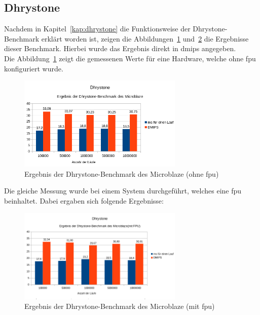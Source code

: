 \subsection{Dhrystone}

Nachdem in Kapitel~\ref{kap:dhrystone} die Funktionsweise der Dhrystone-Benchmark erklärt worden ist, zeigen die Abbildungen~\ref{fig:dhrystonembohnefpu} und~\ref{fig:dhrystonembmitfpu} die Ergebnisse dieser Benchmark.
Hierbei wurde das Ergebnis direkt in \ac{dmips} angegeben.\\
Die Abbildung~\ref{fig:dhrystonembohnefpu} zeigt die gemessenen Werte für eine Hardware, welche ohne \ac{fpu} konfiguriert wurde.

\begin{figure}[H]
\centering
\includegraphics[width=0.7\textwidth]{Hauptteil/dhrystonembohnefpu.png}
\caption{Ergebnis der Dhrystone-Benchmark des Microblaze (ohne \ac{fpu})}
\label{fig:dhrystonembohnefpu}
\end{figure}

Die gleiche Messung wurde bei einem System durchgeführt, welches eine \ac{fpu} beinhaltet. Dabei ergaben sich folgende Ergebnisse:\\

\begin{figure}[H]
\centering
\includegraphics[width=0.7\textwidth]{Hauptteil/dhrystonembmitfpu.png}
\caption{Ergebnis der Dhrystone-Benchmark des Microblaze (mit \ac{fpu})}
\label{fig:dhrystonembmitfpu}
\end{figure}


